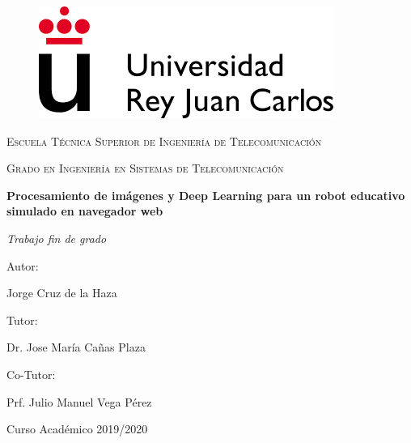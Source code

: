 \documentclass{report}
\begin{document}
\begin{titlepage}
\centering

\begin{figure}[t]
\includegraphics[scale=0.5]{images/urjc_logo.png}
\centering
\vspace{0.5cm} %
\end{figure}

{\scshape\Large Escuela Técnica Superior de Ingeniería de Telecomunicación \par}
\vspace{1cm}
{\scshape\Large Grado en Ingeniería en Sistemas de Telecomunicación \par}
\vspace{3cm}
{\bfseries\LARGE Procesamiento de imágenes y Deep Learning para un robot educativo simulado
en navegador web\par}
\vspace{3cm}
{\itshape\Large Trabajo fin de grado \par}
\vfill
{\Large Autor: }
{\Large Jorge Cruz de la Haza \par}
{\Large Tutor: }
{\Large Dr. Jose María Cañas Plaza \par}
{\Large Co-Tutor: }
{\Large Prf. Julio Manuel Vega Pérez \par}
\vfill
{\Large Curso Académico 2019/2020 \par}
\end{titlepage} 

\renewcommand{\abstractname}{\Large Resumen}
\begin{abstract}
Hablar de Robótica, Kibotics y la ciudad simulada.


\end{abstract}

\setcounter{tocdepth}{3} %
\renewcommand{\contentsname}{Índice general}
\tableofcontents
\clearpage

\renewcommand{\listfigurename}{Índice de figuras}
\listoffigures

\renewcommand{\listtablename}{Índice de tablas}
\listoftables

\renewcommand{\chaptername}{Capítulo}
\end{document}
